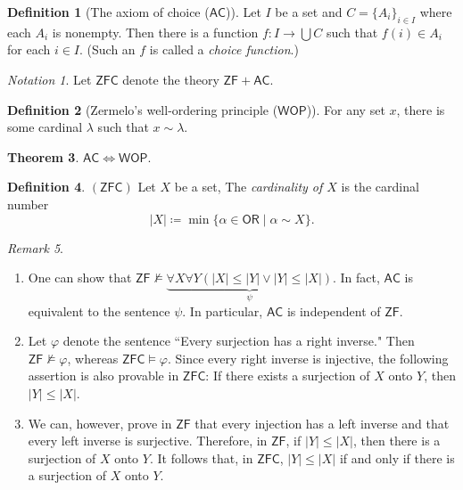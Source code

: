 \documentclass[10pt,letterpaper,cm]{nupset}
\theoremstyle{definition}
\newtheorem{definition}{Definition}[subsection]
\theoremstyle{theorem}
\newtheorem{theorem}[definition]{Theorem}
\theoremstyle{remark}
\newtheorem{remark}[definition]{Remark}
\newtheorem*{notation}{Notation}
\newcommand{\1}{\mathbf{1}}
\newcommand{\0}{\vec 0}
\newcommand{\zf}{\mathsf{ZF}}
\newcommand{\zfc}{\mathsf{ZFC}}
\newcommand{\ac}{\mathsf{AC}}
\newcommand{\ord}{\mathsf{OR}}
\begin{document}
\begin{definition}[The axiom of choice ($\ac$)]
Let $I$ be a set and $C = \{A_i  \}_{i\in I}$ where each $A_i$ is nonempty. Then there is a function $f : I \to \bigcup{C}$ such that $f(i) \in A_i$ for each $i\in I$. (Such an $f$ is called a \textit{choice function}.)
\end{definition}


\begin{notation}
Let $\zfc$ denote the theory $\zf + \ac$.
\end{notation}

\begin{definition}[Zermelo's well-ordering principle ($\mathsf{WOP}$)]
For any set $x$, there is some cardinal $\lambda$ such that $x \sim \lambda$.
\end{definition}

\begin{theorem}
$\ac \iff \mathsf{WOP}$.
\end{theorem}

\begin{definition}{$(\zfc)$}
Let $X$ be a set, The \textit{cardinality of $X$} is the cardinal number $$\lvert{X}\rvert \coloneqq \min\{\alpha \in \ord \mid \alpha \sim X\}.$$
\end{definition}

\begin{remark}\label{LR} $ $
\begin{enumerate}
\item One can show that $\zf \nvDash \underbrace{\forall X\forall Y(\lvert{X}\rvert \leq \lvert{Y}\rvert \vee \lvert{Y}\rvert \leq \lvert{X}\rvert)}_{\psi}$. In fact,  $\ac$ is equivalent to the sentence $\psi$. In particular, $\ac$ is independent of $\zf$.
\item Let $\varphi$ denote the sentence ``Every surjection has a right inverse."  Then $\zf \nvDash \varphi$, whereas  $\zfc \models \varphi$. Since every right inverse is injective, the following assertion is also provable in $\zfc$: If there exists a surjection of $X$ onto $Y$, then $\lvert{Y}\rvert \leq \lvert{X}\rvert$. 
\item We can, however, prove in $\zf$ that every injection has a left inverse and that every left inverse is surjective. Therefore, in $\zf$, if $\lvert{Y}\rvert \leq \lvert{X}\rvert$, then there is a surjection of $X$ onto $Y$. It follows that, in $\zfc$, $\lvert{Y}\rvert \leq \lvert{X}\rvert$ if and only if there is a surjection of $X$ onto $Y$.
\end{enumerate}
\end{remark}
\end{document}
